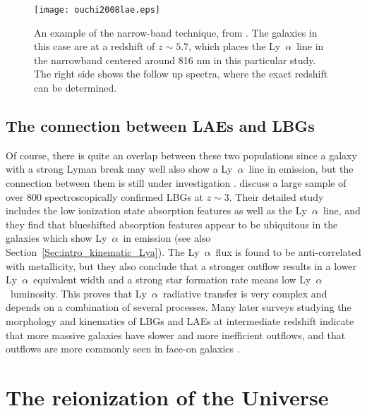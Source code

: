 \documentclass[a4wide,12pt]{book}
\newcommand{\lya}{Ly~${\alpha}$}
\begin{document}
{\begin{figure}
   \centering
   \texttt{[image: ouchi2008lae.eps]}
   \caption{An example of the narrow-band technique, from \citet{ouchi-2008}. The galaxies in this case are at a redshift of $z \sim 5.7$, which places the \lya\ line in the narrowband centered around 816 nm in this particular study. The right side shows the follow up spectra, where the exact redshift can be determined. }
              \label{Fig:LAE}
    \end{figure}

\subsection{The connection between LAEs and LBGs}

Of course, there is quite an overlap between these two populations since a galaxy with a strong Lyman break may well also show a \lya\ line in emission, but the connection between them is still under investigation \citep[see e.g.][and references therein]{dayal-ferrara2012}. \citet{shapley-2003} discuss a large sample of over 800 spectroscopically confirmed LBGs at $z\sim 3$. Their detailed study includes the low ionization state absorption features as well as the \lya\ line, and they find that blueshifted absorption features appear to be ubiquitous in the galaxies which show \lya\ in emission (see also Section~\ref{Sec:intro_kinematic_Lya}). The \lya\ flux is found to be anti-correlated with metallicity, but they also conclude that a stronger outflow results in a lower \lya\ equivalent width and a strong star formation rate means low \lya\ luminosity. This proves that \lya\ radiative transfer is very complex and depends on a combination of several processes. Many later surveys studying the morphology and kinematics of LBGs and LAEs at intermediate redshift indicate that more massive galaxies have slower and more inefficient outflows, and that outflows are more commonly seen in face-on galaxies \citep[see e.g.][and references therein]{kornei-2012,law-2012}. 

\section{The reionization of the Universe}\label{sec:reionization}

}
\end{document}
